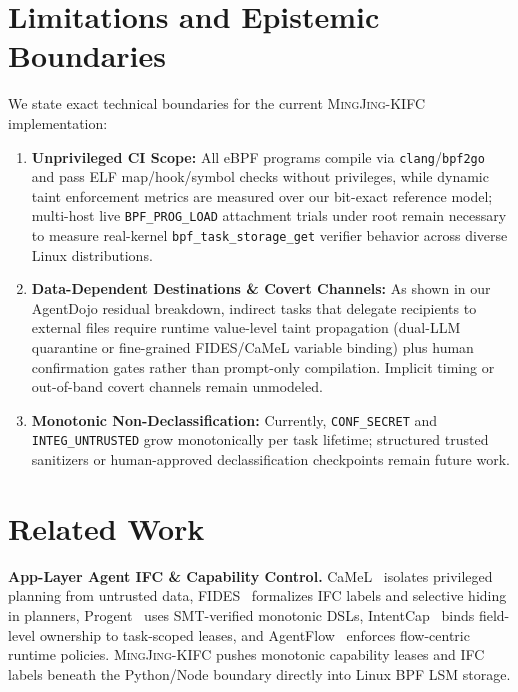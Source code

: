\documentclass[10pt,twocolumn,letterpaper]{article}
\newcommand{\sys}{\textsc{MingJing-KIFC}}
\newcommand{\code}[1]{\texttt{\small #1}}
\begin{document}
\section{Limitations and Epistemic Boundaries}
\label{sec:limitations}

We state exact technical boundaries for the current \sys{} implementation:
\begin{enumerate}
  \item \textbf{Unprivileged CI Scope:} All eBPF programs compile via \code{clang}/\code{bpf2go} and pass ELF map/hook/symbol checks without privileges, while dynamic taint enforcement metrics are measured over our bit-exact  reference model; multi-host live \code{BPF\_PROG\_LOAD} attachment trials under root remain necessary to measure real-kernel \code{bpf\_task\_storage\_get} verifier behavior across diverse Linux distributions.
  \item \textbf{Data-Dependent Destinations \& Covert Channels:} As shown in our AgentDojo residual breakdown, indirect tasks that delegate recipients to external files require runtime value-level taint propagation (dual-LLM quarantine or fine-grained FIDES/CaMeL variable binding) plus human confirmation gates rather than prompt-only compilation. Implicit timing or out-of-band covert channels remain unmodeled.
  \item \textbf{Monotonic Non-Declassification:} Currently, \code{CONF\_SECRET} and \code{INTEG\_UNTRUSTED} grow monotonically per task lifetime; structured trusted sanitizers or human-approved declassification checkpoints remain future work.
\end{enumerate}

\section{Related Work}
\label{sec:related}

\textbf{App-Layer Agent IFC \& Capability Control.} CaMeL~\cite{camel2025} isolates privileged planning from untrusted data, FIDES~\cite{fides2025} formalizes IFC labels and selective hiding in planners, Progent~\cite{progent2025} uses SMT-verified monotonic DSLs, IntentCap~\cite{intentcap2026} binds field-level ownership to task-scoped leases, and AgentFlow~\cite{agentflow2026} enforces flow-centric runtime policies. \sys{} pushes monotonic capability leases and IFC labels beneath the Python/Node boundary directly into Linux BPF LSM storage.
\end{document}
